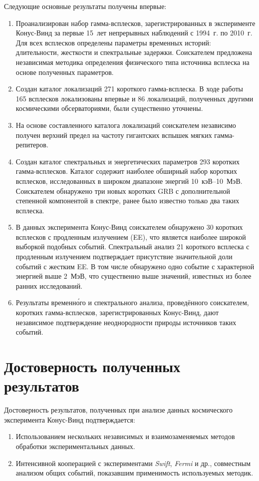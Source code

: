 Следующие основные результаты получены впервые:
\begin{enumerate}
\item Проанализирован набор гамма-всплесков, зарегистрированных в эксперименте 
 Конус-Винд за первые 15~лет непрерывных наблюдений с 1994~г. по 2010~г. Для всех 
 всплесков определены параметры временных историй: длительности, жесткости и спектральные задержки.
 Соискателем предложена независимая методика определения физического типа источника всплеска на основе 
 полученных параметров.
\item Создан каталог локализаций 271 короткого гамма-всплеска. 
 В ходе работы 165 всплесков локализованы впервые и 86 локализаций, 
 полученных другими космическими обсерваториями, были существенно уточнены. 
\item На основе составленного каталога локализаций соискателем независимо
 получен верхний предел на частоту гигантских вспышек мягких гамма-репитеров.
\item Создан каталог спектральных и энергетических параметров 293 коротких гамма-всплесков. 
 Каталог содержит наиболее обширный набор коротких всплесков, исследованных 
 в широком диапазоне энергий 10~кэВ--10~МэВ. 
 Соискателем обнаружено три новых коротких GRB с дополнительной  
 степенной компонентой в спектре, ранее было известно только два таких всплеска.
\item В данных эксперимента Конус-Винд соискателем обнаружено 30 коротких всплесков 
 с продленным излучением (EE), что является наиболее широкой выборкой подобных событий. 
 Спектральный анализ 21 короткого всплеска с продленным излучением подтверждает  
 присутствие значительной доли событий с жестким EE. В том числе обнаружено одно событие 
 с характерной энергией  выше 2~МэВ, что существенно выше значений, известных из более ранних исследований.  
\item Результаты временн\'{о}го и спектрального анализа, проведённого соискателем, коротких гамма-всплесков, 
 зарегистрированных Конус-Винд, дают независимое подтверждение неоднородности 
 природы источников таких событий.
\end{enumerate}

\section*{Достоверность полученных результатов}
Достоверность результатов, полученных при анализе данных космического
эксперимента Конус-Винд подтверждается:
\begin{enumerate}
\item Использованием нескольких независимых и взаимозаменяемых методов обработки экспериментальных данных.
\item Интенсивной кооперацией с экспериментами \textit{Swift}, \textit{Fermi} и др.,
 совместным анализом общих событий, показавшим применимость используемых методик.
\end{enumerate}

